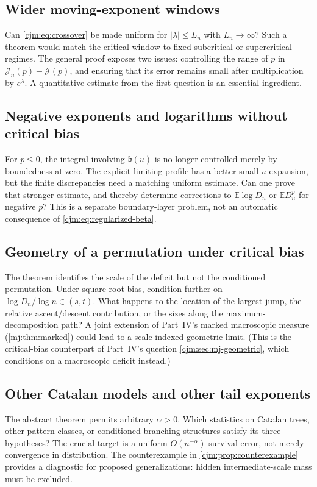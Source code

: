 \documentclass[11pt,a4paper]{article}
\theoremstyle{definition}\newaliascnt{definition}{theorem}
\theoremstyle{remark}\newaliascnt{remark}{theorem}
\newcommand{\ljE}{\mathbb E}
\begin{document}
\subsection{Wider moving-exponent windows}
Can \eqref{cjm:eq:crossover} be made uniform for
$|\lambda|\le L_n$ with $L_n\to\infty$? Such a theorem would match the
critical window to fixed subcritical or supercritical regimes.
The general proof exposes two issues: controlling the range of $p$ in
$\mathcal J_n(p)-\mathcal J(p)$, and ensuring that its error remains small
after multiplication by $e^\lambda$. A quantitative estimate from the first
question is an essential ingredient.

\subsection{Negative exponents and logarithms without critical bias}
For $p\le0$, the integral involving $\mathfrak b(u)$ is no longer controlled
merely by boundedness at zero. The explicit limiting profile has a better
small-$u$ expansion, but the finite discrepancies need a matching uniform
estimate. Can one prove that stronger estimate, and thereby determine
corrections to $\ljE\log D_n$ or $\ljE D_n^p$ for negative $p$? This is a
separate boundary-layer problem, not an automatic consequence of
\eqref{cjm:eq:regularized-beta}.

\subsection{Geometry of a permutation under critical bias}
The theorem identifies the scale of the deficit but not the conditioned
permutation. Under square-root bias, condition further on
$\log D_n/\log n\in(s,t)$. What happens to the location of the largest
jump, the relative ascent/descent contribution, or the sizes along the
maximum-decomposition path? A joint extension of Part~IV's marked
macroscopic measure (\cref{mj:thm:marked}) could lead to a scale-indexed
geometric limit. (This is the critical-bias counterpart of Part~IV's
question \cref{cjm:sec:mj-geometric}, which conditions on a macroscopic
deficit instead.)

\subsection{Other Catalan models and other tail exponents}
\label{pr:sec:cjm-other}
The abstract theorem permits arbitrary $\alpha>0$. Which statistics on
Catalan trees, other pattern classes, or conditioned branching structures
satisfy its three hypotheses? The crucial target is a uniform
$O(n^{-\alpha})$ survival error, not merely convergence in distribution.
The counterexample in \cref{cjm:prop:counterexample} provides a diagnostic
for proposed generalizations: hidden intermediate-scale mass must be
excluded.
\end{document}
